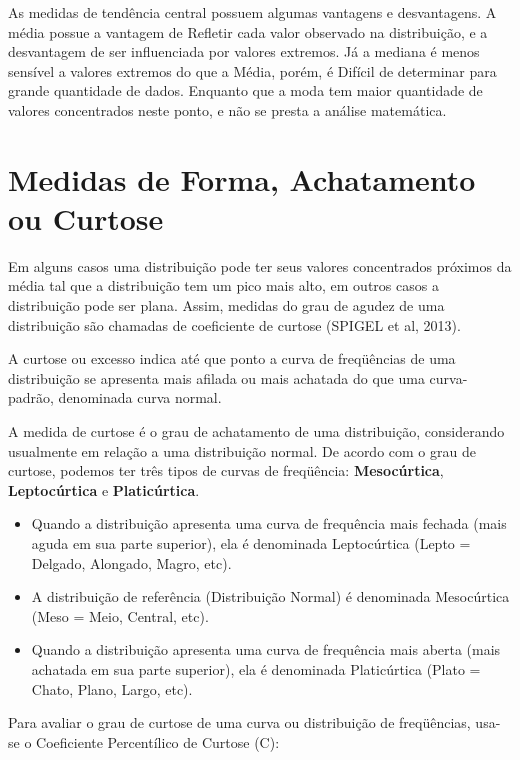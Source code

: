 As medidas de tendência  central possuem algumas vantagens e desvantagens. A média possue a vantagem de Refletir cada valor observado na distribuição, e a desvantagem de ser influenciada por valores extremos. Já a mediana é menos sensível a valores extremos do que a Média, porém, é Difícil de determinar para grande quantidade de dados. Enquanto que a moda tem maior quantidade de valores concentrados neste ponto, e não se presta a análise matemática.
 
\newpage 

\section{Medidas de Forma, Achatamento ou Curtose }

\inic Em alguns casos uma distribuição pode ter seus valores concentrados próximos da média tal que a distribuição tem um pico mais alto, em outros casos a distribuição pode ser plana. Assim, medidas do grau de agudez de uma distribuição são chamadas de coeficiente de curtose (SPIGEL et al, 2013). \vskip0.3cm

\inic A curtose ou excesso indica até que ponto a curva de freqüências de uma distribuição se apresenta mais afilada ou mais achatada do que uma curva-padrão, denominada curva normal.\vskip0.3cm

\inic A medida de curtose é o grau de achatamento de uma distribuição, considerando usualmente em relação a uma distribuição normal. De acordo com o grau de curtose, podemos ter três tipos de curvas de freqüência: \textbf{Mesocúrtica}, \textbf{Leptocúrtica} e \textbf{Platicúrtica}.\vskip0.3cm

\begin{itemize}
\item Quando a distribuição apresenta uma curva de frequência mais fechada (mais aguda em sua parte superior), ela é denominada Leptocúrtica (Lepto = Delgado, Alongado, Magro, etc).
\item A distribuição de referência (Distribuição Normal) é denominada Mesocúrtica (Meso = Meio, Central, etc).
\item Quando a distribuição apresenta uma curva de frequência mais aberta (mais achatada em sua parte superior), ela é denominada Platicúrtica (Plato = Chato, Plano, Largo, etc).
\end{itemize}

Para avaliar o grau de curtose de uma curva ou distribuição de freqüências, usa-se o Coeficiente Percentílico de Curtose (C):

